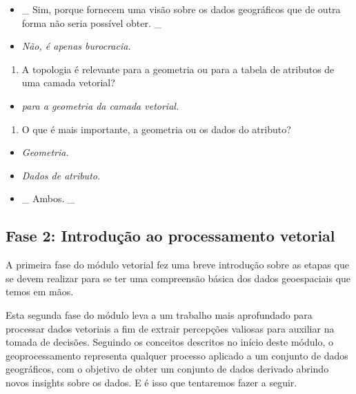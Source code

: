 \documentclass[
]{book}
\providecommand{\tightlist}{%
  \setlength{\itemsep}{0pt}\setlength{\parskip}{0pt}}
\begin{document}
\begin{itemize}
\tightlist
\item
  \_ { Sim, porque fornecem uma visão sobre os dados geográficos que de outra forma não seria possível obter. } \_
\item
  \emph{Não, é apenas burocracia. }
\end{itemize}

\begin{enumerate}
\def\labelenumi{\arabic{enumi}.}
\setcounter{enumi}{1}
\tightlist
\item
  A topologia é relevante para a geometria ou para a tabela de atributos de uma camada vetorial?
\end{enumerate}

\begin{itemize}
\tightlist
\item
  \emph{para a geometria da camada vetorial. }
\end{itemize}

\begin{enumerate}
\def\labelenumi{\arabic{enumi}.}
\setcounter{enumi}{2}
\tightlist
\item
  O que é mais importante, a geometria ou os dados do atributo?
\end{enumerate}

\begin{itemize}
\tightlist
\item
  \emph{Geometria.}
\item
  \emph{Dados de atributo.}
\item
  \_ { Ambos. } \_
\end{itemize}

\hypertarget{fase-2-introduuxe7uxe3o-ao-processamento-vetorial}{%
\subsection{Fase 2: Introdução ao processamento vetorial}\label{fase-2-introduuxe7uxe3o-ao-processamento-vetorial}}

A primeira fase do módulo vetorial fez uma breve introdução sobre as etapas que se devem realizar para se ter uma compreensão básica dos dados geoespaciais que temos em mãos.

Esta segunda fase do módulo leva a um trabalho mais aprofundado para processar dados vetoriais a fim de extrair percepções valiosas para auxiliar na tomada de decisões. Seguindo os conceitos descritos no início deste módulo, o geoprocessamento representa qualquer processo aplicado a um conjunto de dados geográficos, com o objetivo de obter um conjunto de dados derivado abrindo novos insights sobre os dados. E é isso que tentaremos fazer a seguir.
\end{document}
